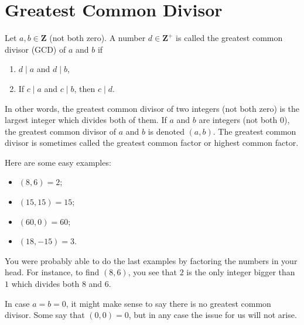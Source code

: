 \section{Greatest Common Divisor}
\begin{Definition}{}{}
    Let $ a,b\in\mathbf{Z} $ (not both zero). A number $ d\in\mathbf{Z}^+ $ is called the greatest common divisor (GCD) of $ a $ and $ b $ if
    \begin{enumerate}[(1)]
        \item $ d\mid a $ and $ d\mid b $,
        \item If $ c\mid a $ and $ c\mid b $, then $ c\mid d $.
    \end{enumerate}
    In other words, the greatest common divisor of two integers (not both zero) is
    the largest integer which divides both of them. If $a$ and $b$ are integers (not both
    $0$), the greatest common divisor of $a$ and $b$ is denoted $(a,b)$. The greatest common
    divisor is sometimes called the greatest common factor or highest common factor.
\end{Definition}
Here are some easy examples:
\begin{itemize}
    \item $ (8,6)=2 $;
    \item $ (15,15)=15 $;
    \item $ (60,0)=60 $;
    \item $ (18,-15)=3 $.
\end{itemize}
You were probably able to do the last examples by factoring the numbers in
your head. For instance, to find $(8,6)$, you see that $2$ is the only integer bigger
than $1$ which divides both $8$ and $6$.

In case $a = b = 0$, it might make sense to say there is no greatest common
divisor. Some say that $(0,0) = 0$, but in any case the issue for us will not arise.

